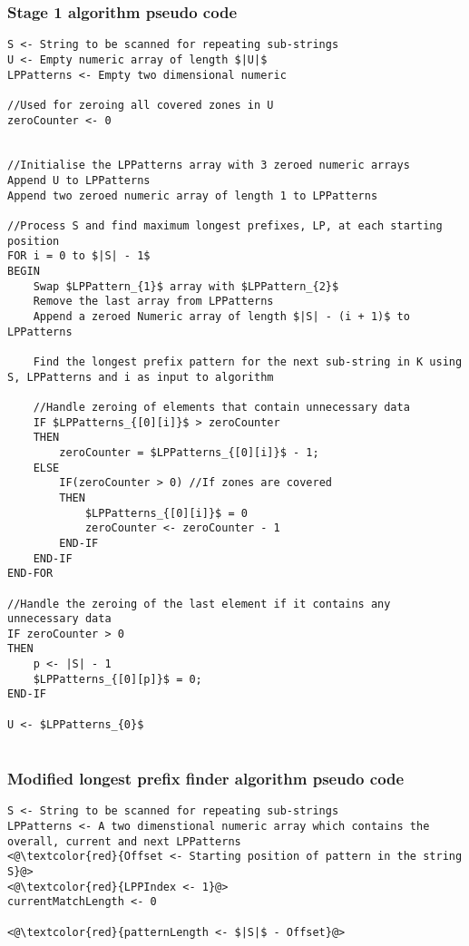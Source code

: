 \documentclass[12pt]{article}
\begin{document}
\begin{flushleft}
		\subsubsection{Stage 1 algorithm pseudo code}
\begin{lstlisting}
S <- String to be scanned for repeating sub-strings
U <- Empty numeric array of length $|U|$
LPPatterns <- Empty two dimensional numeric

//Used for zeroing all covered zones in U
zeroCounter <- 0 
 

//Initialise the LPPatterns array with 3 zeroed numeric arrays
Append U to LPPatterns 
Append two zeroed numeric array of length 1 to LPPatterns

//Process S and find maximum longest prefixes, LP, at each starting position
FOR i = 0 to $|S| - 1$
BEGIN
	Swap $LPPattern_{1}$ array with $LPPattern_{2}$
	Remove the last array from LPPatterns    
	Append a zeroed Numeric array of length $|S| - (i + 1)$ to LPPatterns
	
	Find the longest prefix pattern for the next sub-string in K using S, LPPatterns and i as input to algorithm
	
	//Handle zeroing of elements that contain unnecessary data
	IF $LPPatterns_{[0][i]}$ > zeroCounter 
	THEN
		zeroCounter = $LPPatterns_{[0][i]}$ - 1;
	ELSE 
		IF(zeroCounter > 0) //If zones are covered
		THEN
			$LPPatterns_{[0][i]}$ = 0
			zeroCounter <- zeroCounter - 1
		END-IF                   
	END-IF
END-FOR

//Handle the zeroing of the last element if it contains any unnecessary data
IF zeroCounter > 0
THEN
	p <- |S| - 1
	$LPPatterns_{[0][p]}$ = 0;
END-IF

U <- $LPPatterns_{0}$


\end{lstlisting}

\newpage
\subsubsection{Modified longest prefix finder algorithm pseudo code}

\begin{lstlisting}
S <- String to be scanned for repeating sub-strings
LPPatterns <- A two dimenstional numeric array which contains the overall, current and next LPPatterns 
<@\textcolor{red}{Offset <- Starting position of pattern in the string S}@>
<@\textcolor{red}{LPPIndex <- 1}@> 
currentMatchLength <- 0

<@\textcolor{red}{patternLength <- $|S|$ - Offset}@>


\end{lstlisting}
\end{flushleft}
\end{document}
